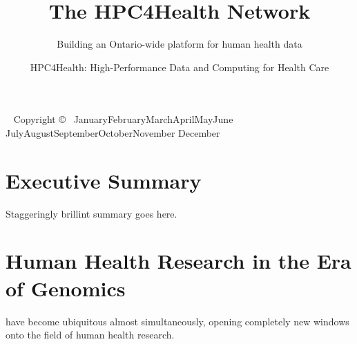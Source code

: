 \documentclass[twoside,symmetric,sfsidenotes,notoc]{tufte-book}
\title{The HPC4Health Network}
\subtitle{Building an Ontario-wide platform for human health data}
\author{HPC4Health: High-Performance Data and Computing for Health Care}
\newcommand{\monthyear}{%
  \ifcase\month\or January\or February\or March\or April\or May\or June\or
  July\or August\or September\or October\or November\or
  December\fi\space\number\year
}
\begin{document}
\frontmatter

\maketitle


\newpage
\begin{fullwidth}
~\vfill
\thispagestyle{empty}
\setlength{\parindent}{0pt}
\setlength{\parskip}{\baselineskip}
Copyright \copyright\ \monthyear
\par{}
\par{}
\end{fullwidth}

\cleardoublepage
\chapter*{Executive Summary}

Staggeringly brillint summary goes here.

\mainmatter

\chapter{Human Health Research in the Era of Genomics}
\label{ch:health-data-at-scale}

 have 
become ubiquitous almost simultaneously, opening completely new windows onto the field
of human health research.  
\end{document}
